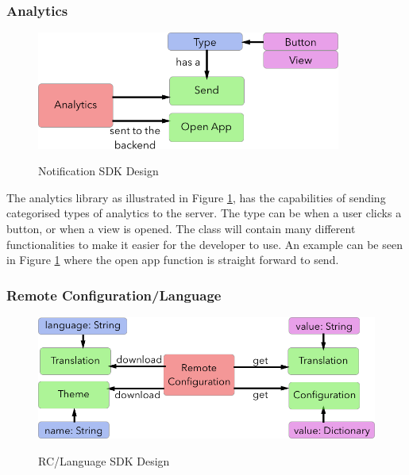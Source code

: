 \subsubsection{Analytics} \label{d-sdk:analytics}

\begin{figure}[!h]
    \caption{Notification SDK Design}
    \centering
    \includegraphics[width=100mm]{images/design/analytics}
    \label{fig:analytics_design}
\end{figure}

The analytics library as illustrated in Figure \ref{fig:analytics_design}, has the capabilities of sending categorised types of analytics to the server. The type can be when a user clicks a button, or when a view is opened. The class will contain many different functionalities to make it easier for the developer to use. An example can be seen in Figure \ref{fig:analytics_design} where the open app function is straight forward to send.

\subsubsection{Remote Configuration/Language} \label{d-sdk:rc_l}

\begin{figure}[!h]
    \caption{RC/Language SDK Design}
    \centering
    \includegraphics[width=120mm]{images/design/remote_config}
    \label{fig:remote_config_design}
\end{figure}


